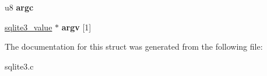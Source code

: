 \begin{DoxyCompactItemize}
\item 
u8 {\bfseries argc}\hypertarget{structsqlite3__context_a3246bd9287c845864193f0519804aede}{}\label{structsqlite3__context_a3246bd9287c845864193f0519804aede}

\item 
\hyperlink{structMem}{sqlite3\+\_\+value} $\ast$ {\bfseries argv} \mbox{[}1\mbox{]}\hypertarget{structsqlite3__context_a416e22362626c80a9dd4c7909871d90c}{}\label{structsqlite3__context_a416e22362626c80a9dd4c7909871d90c}

\end{DoxyCompactItemize}


The documentation for this struct was generated from the following file\+:\begin{DoxyCompactItemize}
\item 
sqlite3.\+c\end{DoxyCompactItemize}
